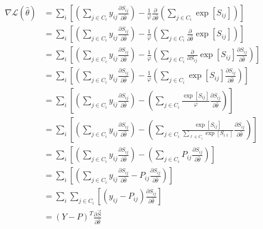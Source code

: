 \documentclass{article}
\begin{document}
\begin{equation}
\label{eqn:gradient_log_likelihood}
\begin{aligned}
\nabla \mathcal{L} \left( \hat{\theta} \right) &= \sum _i  \left[ \left( \sum _{j \in C_i}  y_{ij} \frac{\partial S_{ij}}{\partial \hat{\theta}} \right)  - \frac{1}{\varphi} \frac{\partial}{\partial \hat{\theta}} \left( \sum _{j \in C_i} \exp \left[ S_{ij} \right] \right) \right] \\
&= \sum _i  \left[ \left( \sum _{j \in C_i}  y_{ij} \frac{\partial S_{ij}}{\partial \hat{\theta}} \right)  - \frac{1}{\varphi} \left( \sum _{j \in C_i} \frac{\partial}{\partial \hat{\theta}} \exp \left[ S_{i j} \right] \right) \right] \\
&= \sum _i  \left[ \left( \sum _{j \in C_i}  y_{ij} \frac{\partial S_{ij}}{\partial \hat{\theta}} \right)  - \frac{1}{\varphi} \left( \sum _{j \in C_i} \frac{\partial}{\partial S_{ij}} \exp \left[ S_{i j} \right] \frac{\partial S_{ij}}{\partial \hat{\theta}} \right) \right] \\
&= \sum _i  \left[ \left( \sum _{j \in C_i}  y_{ij} \frac{\partial S_{ij}}{\partial \hat{\theta}} \right)  - \frac{1}{\varphi} \left( \sum _{j \in C_i} \exp \left[ S_{i j} \right] \frac{\partial S_{ij}}{\partial \hat{\theta}} \right) \right] \\
&= \sum _i  \left[ \left( \sum _{j \in C_i}  y_{ij} \frac{\partial S_{ij}}{\partial \hat{\theta}} \right)  - \left( \sum _{j \in C_i} \frac{\exp \left[ S_{i j} \right]}{\varphi} \frac{\partial S_{ij}}{\partial \hat{\theta}} \right) \right] \\
&= \sum _i  \left[ \left( \sum _{j \in C_i}  y_{ij} \frac{\partial S_{ij}}{\partial \hat{\theta}} \right)  - \left( \sum _{j \in C_i} \frac{\exp \left[ S_{i j} \right]}{\sum _{\ell \in C_i} \exp \left[ S_{i \ell} \right]} \frac{\partial S_{ij}}{\partial \hat{\theta}} \right) \right] \\
&= \sum _i  \left[ \left( \sum _{j \in C_i}  y_{ij} \frac{\partial S_{ij}}{\partial \hat{\theta}} \right)  - \left( \sum _{j \in C_i} P_{ij} \frac{\partial S_{ij}}{\partial \hat{\theta}} \right) \right] \\
&= \sum _i  \left[ \left( \sum _{j \in C_i}  y_{ij} \frac{\partial S_{ij}}{\partial \hat{\theta}} - P_{ij} \frac{\partial S_{ij}}{\partial \hat{\theta}} \right) \right] \\
&= \sum _i  \sum _{j \in C_i}  \left[ \left( y_{ij}  - P_{ij} \right) \frac{\partial S_{ij}}{\partial \hat{\theta}} \right] \\
&= \left( Y - P \right)^T \frac{\partial \vec{S}}{\partial \hat{\theta}} \\

\end{aligned}
\end{equation}
\end{document}
